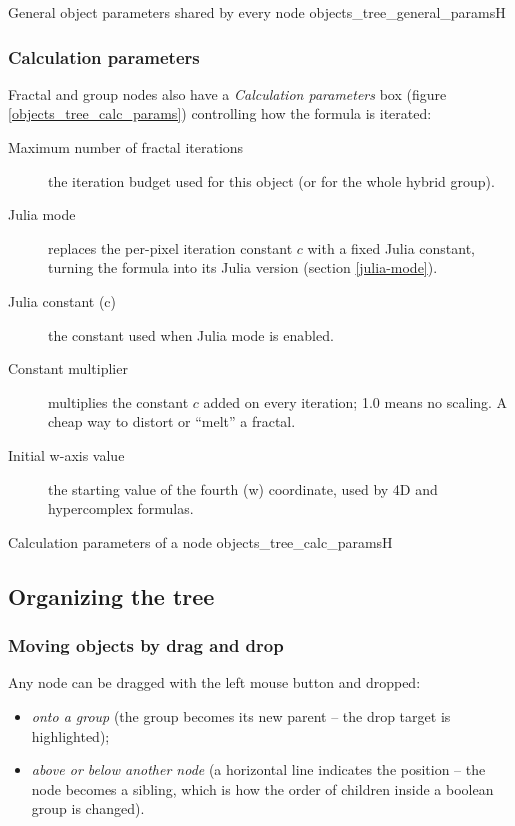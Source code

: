 {General object parameters shared by every node}
{objects_tree_general_params}{H}

\subsubsection{Calculation parameters}\label{objects-tree-calc-params}

Fractal and group nodes also have a \emph{Calculation parameters} box (figure
\ref{objects_tree_calc_params}) controlling how the formula is iterated:

\begin{description}
	\item[Maximum number of fractal iterations] the iteration budget used for this object (or for
	the whole hybrid group).
	\item[Julia mode] replaces the per-pixel iteration constant $c$ with a fixed Julia constant,
	turning the formula into its Julia version (section \ref{julia-mode}).
	\item[Julia constant (c)] the constant used when Julia mode is enabled.
	\item[Constant multiplier] multiplies the constant $c$ added on every iteration; 1.0 means no
	scaling. A cheap way to distort or ``melt'' a fractal.
	\item[Initial w-axis value] the starting value of the fourth (w) coordinate, used by 4D and
	hypercomplex formulas.
\end{description}

{Calculation parameters of a node}
{objects_tree_calc_params}{H}

\subsection{Organizing the tree}\label{objects-tree-organizing}

\subsubsection{Moving objects by drag and drop}\label{objects-tree-drag-drop}

Any node can be dragged with the left mouse button and dropped:

\begin{itemize}
	\item \emph{onto a group} (the group becomes its new parent -- the drop target is highlighted);
	\item \emph{above or below another node} (a horizontal line indicates the position -- the node
	becomes a sibling, which is how the order of children inside a boolean group is changed).
\end{itemize}

